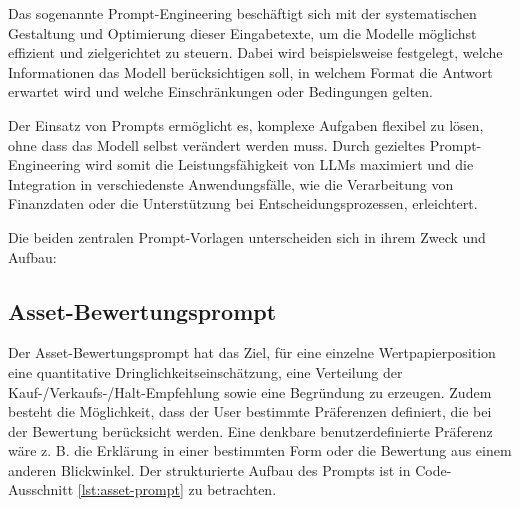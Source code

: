     Das sogenannte Prompt-Engineering beschäftigt sich mit der systematischen Gestaltung und Optimierung dieser Eingabetexte, um die Modelle möglichst effizient und zielgerichtet zu steuern.
    Dabei wird beispielsweise festgelegt, welche Informationen das Modell berücksichtigen soll, in welchem Format die Antwort erwartet wird und welche Einschränkungen oder Bedingungen gelten.

    Der Einsatz von Prompts ermöglicht es, komplexe Aufgaben flexibel zu lösen, ohne dass das Modell selbst verändert werden muss.
    Durch gezieltes Prompt-Engineering wird somit die Leistungsfähigkeit von \acs{LLM}s maximiert und die Integration in verschiedenste Anwendungsfälle, wie die Verarbeitung von Finanzdaten oder die Unterstützung bei Entscheidungsprozessen, erleichtert.

    Die beiden zentralen Prompt-Vorlagen unterscheiden sich in ihrem Zweck und Aufbau:

    \subsection{Asset-Bewertungsprompt}
    \label{sec:prompt-asset}

      Der Asset-Bewertungsprompt hat das Ziel, für eine einzelne Wertpapierposition eine quantitative Dringlichkeitseinschätzung, eine Verteilung der Kauf-/Verkaufs-/Halt-Empfehlung sowie eine Begründung zu erzeugen.
      Zudem besteht die Möglichkeit, dass der User bestimmte Präferenzen definiert, die bei der Bewertung berücksicht werden.
      Eine denkbare benutzerdefinierte Präferenz wäre z. B. die Erklärung in einer bestimmten Form oder die Bewertung aus einem anderen Blickwinkel.
      Der strukturierte Aufbau des Prompts ist in Code-Ausschnitt \ref{lst:asset-prompt} zu betrachten.

